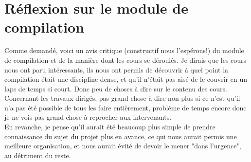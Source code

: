\section{Réflexion sur le module de compilation}

Comme demandé, voici un avis critique (constructif nous l'espérons!) du module de compilation et de la manière dont les cours se déroulés.
Je dirais que les cours nous ont paru intéressants, ils nous ont permis de découvrir à quel point la compilation était une discipline dense, et qu'il n'était pas aisé de le couvrir en un laps de temps si court. Donc peu de choses à dire sur le contenu des cours.\\
Concernant les travaux dirigés, pas grand chose à dire non plus si ce n'est qu'il n'a pas été possible de tous les faire entièrement, problème de temps encore donc je ne vois pas grand chose à reprocher aux intervenants.\\
En revanche, je pense qu'il aurait été beaucoup plus simple de prendre connaissance du sujet du projet plus en avance, ce qui nous aurait permis une meilleure organisation, et nous aurait évité de devoir le mener "dans l'urgence", au détriment du reste. 	
